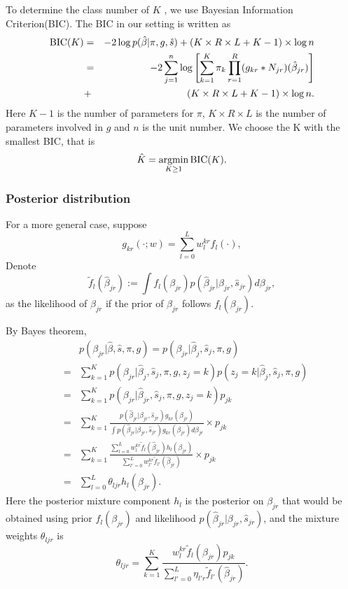 \documentclass[11pt]{article}
\DeclareMathOperator*{\argmin}{argmin}
\begin{document}
To determine the class number of $K$ , we use Bayesian Information Criterion(BIC). The BIC in our setting is written as 
\begin{eqnarray}
{\rm BIC}(K) &=& -2\log p(\hat\beta|\pi,g,\hat s) + (K\times R\times L+K-1)\times \log n \nonumber \\
&=& -2 \sum_{j=1}^n\log\left[\sum_{k=1}^K\pi_k\prod_{r=1}^R(g_{kr}*N_{jr})(\hat\beta_{jr})\right] \nonumber\\
&+& (K\times R\times L+K-1)\times \log n.
\end{eqnarray}
Here $K-1$ is the number of parameters for $\pi$, $K\times R\times L$ is the number of parameters involved in $g$ and $n$ is the unit number. We choose the K with the smallest BIC, that is 
\begin{equation}
\hat K = \argmin_{K\geq1} {\rm BIC}(K).
\end{equation}

\subsubsection{Posterior distribution}

For a more general case, suppose
\begin{equation}
g_{kr}(\cdot;w) = \sum_{l=0}^L w_l^{kr}f_l(\cdot),
\label{eq:geng}
\end{equation}
Denote 
\begin{equation}
     \tilde f_{l}(\hat\beta_{jr}) := \int f_l(\beta_{jr})p(\hat\beta_{jr}|\beta_{jr},\hat s_{jr})d\beta_{jr},
\end{equation}
as the likelihood of $\hat\beta_{jr}$ if the prior of $\beta_{jr}$ follows $f_l(\beta_{jr})$. 

By Bayes theorem, 
\begin{eqnarray}
&&p(\beta_{jr}|\hat\beta,\hat s,\pi, g) = p(\beta_{jr}|\hat\beta_{j},\hat s_j,\pi, g)\nonumber \\
&=& \sum_{k=1}^Kp(\beta_{jr}|\hat\beta_{j},\hat s_j,\pi,g,z_j=k)p(z_j=k|\hat\beta_{j},\hat s_j,\pi, g) \nonumber\\
&=& \sum_{k=1}^Kp(\beta_{jr}|\hat\beta_{jr},\hat s_j,\pi,g,z_j=k)p_{jk}\nonumber \\
&=& \sum_{k=1}^K\frac{p(\hat\beta_{jr}|\beta_{jr},\hat s_{jr})g_{kr}(\beta_{jr})}{\int p(\hat\beta_{jr}|\beta_{jr},\hat s_{jr})g_{kr}(\beta_{jr})d\beta_{jr}}\times p_{jk} \nonumber\\
&=& \sum_{k=1}^K \frac{\sum_{l=0}^Lw_l^{kr}\tilde f_{l}(\hat\beta_{jr})h_{l}(\beta_{jr}) }{\sum_{l'=0}^Lw_{l'}^{kr}\tilde f_{l'}(\hat\beta_{jr})} \times p_{jk} \nonumber\\
&=& \sum_{l=0}^L \theta_{ljr}h_{l}(\beta_{jr}). 
\end{eqnarray}
Here the posterior mixture component $h_l$ is the posterior on $\beta_{jr}$ that would be obtained using prior $f_l(\beta_{jr})$ and likelihood $p(\hat\beta_{jr}|\beta_{jr},\hat s_{jr})$, and the mixture weights $\theta_{ljr}$ is
\begin{equation}
     \theta_{ljr} = \sum_{k=1}^K\frac{w_{l}^{kr}\tilde f_{l}(\hat\beta_{jr})p_{jk}}{\sum_{l'=0}^L\eta_{l'r}\tilde f_{l'}(\hat\beta_{jr})}.
\end{equation}
\end{document}
